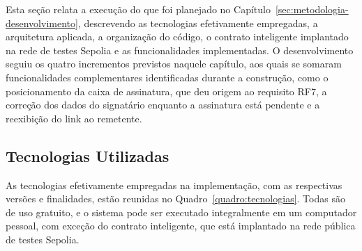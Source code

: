 \documentclass[
    12pt,
    a4paper,
    oneside,
    chapter=TITLE,
    section=TITLE,
    subsection=TITLE,
    subsubsection=TITLE,
    sumario=tradicional,
    english,
    brazil
]{abntex2}
\begin{document}
Esta seção relata a execução do que foi planejado no Capítulo~\ref{sec:metodologia-desenvolvimento}, descrevendo as tecnologias efetivamente empregadas, a arquitetura aplicada, a organização do código, o contrato inteligente implantado na rede de testes Sepolia e as funcionalidades implementadas. O desenvolvimento seguiu os quatro incrementos previstos naquele capítulo, aos quais se somaram funcionalidades complementares identificadas durante a construção, como o posicionamento da caixa de assinatura, que deu origem ao requisito RF7, a correção dos dados do signatário enquanto a assinatura está pendente e a reexibição do link ao remetente.

\subsection{Tecnologias Utilizadas}
\label{sec:impl-tecnologias}

As tecnologias efetivamente empregadas na implementação, com as respectivas versões e finalidades, estão reunidas no Quadro~\ref{quadro:tecnologias}. Todas são de uso gratuito, e o sistema pode ser executado integralmente em um computador pessoal, com exceção do contrato inteligente, que está implantado na rede pública de testes Sepolia.
\end{document}

